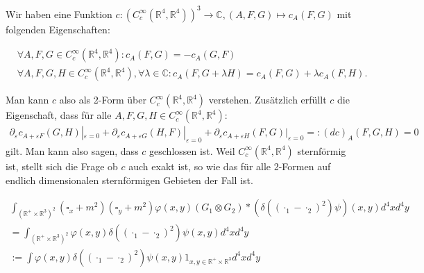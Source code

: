 \documentclass[a4paper,11pt]{article}
\begin{document}
Wir haben eine Funktion \(c: (C_c^\infty(\mathbb{R}^4,\mathbb{R}^4))^3\rightarrow \mathbb{C}, (A,F,G)\mapsto c_A(F,G)\) mit folgenden Eigenschaften:

\begin{align}
&\forall A,F,G \in C_c^\infty(\mathbb{R}^4,\mathbb{R}^4): c_A(F,G)=-c_A(G,F)\\
&\forall A,F,G, H \in C_c^\infty(\mathbb{R}^4,\mathbb{R}^4), \forall \lambda \in \mathbb{C}: c_A(F,G+\lambda H)= c_A(F,G)+ \lambda c_A(F,H).
\end{align} 

Man kann \(c\) also als 2-Form über \( C_c^\infty(\mathbb{R}^4,\mathbb{R}^4)\) verstehen. Zusätzlich erfüllt \(c\) die Eigenschaft, dass für alle 
\( A,F,G, H \in C_c^\infty(\mathbb{R}^4,\mathbb{R}^4)\): 
\begin{align}
\partial_\varepsilon c_{A+\varepsilon F}(G,H)|_{\varepsilon =0}+\partial_\varepsilon c_{A+\varepsilon G}(H,F)|_{\varepsilon =0} 
+ \partial_{\varepsilon} c_{A+\varepsilon H}(F,G)|_{\varepsilon =0}=: (d c)_A (F,G,H)=0
\end{align}
gilt.
Man kann also sagen, dass \(c\) geschlossen ist. Weil \(C_c^\infty(\mathbb{R}^4,\mathbb{R}^4)\) sternförmig ist, stellt sich die Frage ob \(c\) auch exakt ist, 
so wie das für alle 2-Formen auf endlich dimensionalen sternförmigen Gebieten der Fall ist. 



\newpage

\begin{align}
\int_{(\mathbb{R}^+\times \mathbb{R}^3)^2} (\square_x + m^2)(\square_y + m^2) \varphi(x,y) (G_1\otimes G_2) * (\delta((\cdot_1-\cdot_2)^2) \psi) (x,y) d^4 x d^4 y\\
=\int_{(\mathbb{R}^+\times \mathbb{R}^3)^2} \varphi(x,y) \delta ( (\cdot_1 - \cdot_2)^2) \psi(x,y) d^4 x d^4y\\
:=\int\varphi(x,y) \delta ( (\cdot_1 - \cdot_2)^2) \psi(x,y) 1_{x,y\in \mathbb{R}^+\times \mathbb{R}^3} d^4 x d^4y
\end{align}
\end{document}

